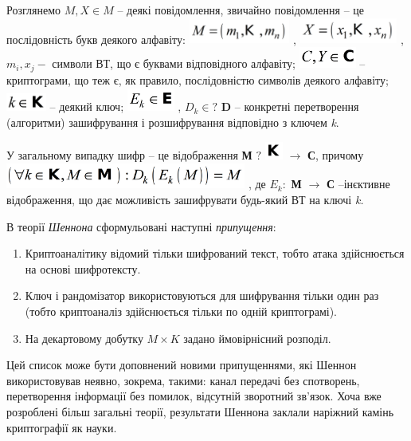 \documentclass[a4paper]{article}
\newcommand\liststyleWWviiiNumxix{%
\renewcommand\theenumi{\arabic{enumi}}
\renewcommand\theenumii{\arabic{enumii}}
\renewcommand\theenumiii{\arabic{enumiii}}
\renewcommand\theenumiv{\arabic{enumiv}}
\renewcommand\labelenumi{\theenumi.}
\renewcommand\labelenumii{\theenumii.}
\renewcommand\labelenumiii{\theenumiii.}
\renewcommand\labelenumiv{\theenumiv.}
}
\newcounter{}
\begin{document}
Розглянемо  ${M,X\in M}$ – деякі повідомлення, звичайно повідомлення – це
послідовність букв  деякого алфавіту: 
\includegraphics[width=1.311in,height=0.3189in]{crypt-img/crypt-img6.png} , 
\includegraphics[width=1.2681in,height=0.3354in]{crypt-img/crypt-img7.png} , 
${m_{{i}},x_{{j}}-}$ символи ВТ, що є буквами відповідного алфавіту; 
\includegraphics[width=0.739in,height=0.2709in]{crypt-img/crypt-img8.png}  –
криптограми, що теж є, як правило, послідовністю символів деякого алфавіту; 
\includegraphics[width=0.5193in,height=0.2311in]{crypt-img/crypt-img9.png}  –
деякий ключ; 
\includegraphics[width=0.6146in,height=0.3016in]{crypt-img/crypt-img10.png} , 
${D_{{k}}\in ?}$ \textbf{D} – конкретні перетворення (алгоритми) зашифрування і
розшифрування відповідно з ключем \textit{k}. 

У загальному випадку шифр – це відображення \textbf{М} ${?}$
\includegraphics[width=0.2311in,height=0.2311in]{crypt-img/crypt-img11.png} 
${\rightarrow }$\textbf{ С}, причому
\includegraphics[width=3.1173in,height=0.3346in]{crypt-img/crypt-img12.png} , 
де   ${E_{{k}}:}$ \textbf{М} ${\rightarrow }$\textbf{ С}
–ін{\textquotesingle}єктивне відображення, що дає можливість зашифрувати 
будь-який ВТ на ключі \textit{k.}

В теорії \textit{Шеннона} сформульовані наступні \textit{припущення}:

\liststyleWWviiiNumxix
\begin{enumerate}
\item Криптоаналітику відомий тільки шифрований текст, тобто атака здійснюється
на основі шифротексту.
\item Ключ і рандомізатор використовуються для шифрування тільки один раз (тобто
криптоаналіз здійснюється тільки по одній криптограмі). 
\item На  декартовому добутку  ${M\times K}$ задано ймовірнісний розподіл.
\end{enumerate}
 Цей список може бути доповнений новими припущеннями, які Шеннон використовував
неявно, зокрема, такими:  канал передачі без спотворень, перетворення
інформації без помилок, відсутній зворотний зв’язок. Хоча вже розроблені більш
загальні теорії, результати Шеннона заклали наріжний камінь криптографії як
науки.
\end{document}
